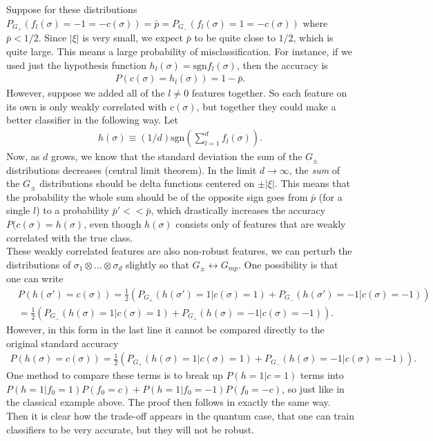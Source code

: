 \documentclass[onecolumn,prx, superscriptaddress,longbibliography,margin=1mm 11pt]{revtex4-2}
\begin{document}
     Suppose for these distributions
     $P_{G_+}(f_l(\sigma)=-1=-c(\sigma))=\bar{p}=P_{G_-}(f_l(\sigma)=1=-c(\sigma))$ where $\bar{p}<1/2$. Since $|\xi|$ is very small, we expect $\bar{p}$ to be quite close to $1/2$, which is quite large. This means a large probability of misclassification. For instance, if we used just the hypothesis function $h_l(\sigma)=\text{sgn}f_l(\sigma)$, then the accuracy is 
     \begin{align}
         P(c(\sigma)=h_l(\sigma))=1-\bar{p}.
     \end{align}
     However, suppose we added all of the $l\neq 0$ features together. So each feature on its own is only weakly correlated with $c(\sigma)$, but together they could make a better classifier in the following way. Let 
     \begin{align}
        h(\sigma) \equiv (1/d) \text{sgn}(\sum_{l=1}^d f_l(\sigma)).
     \end{align}
     Now, as $d$ grows, we know that the standard deviation the sum of the $G_{\pm}$ distributions decreases (central limit theorem). In the limit $d \rightarrow \infty$, the \textit{sum} of the $G_{\pm}$ distributions should be delta functions centered on $\pm|\xi|$. This means that the probability the whole sum should be of the opposite sign goes from $\bar{p}$ (for a single $l$) to a probability $\bar{p}'<<\bar{p}$, which drastically increases the accuracy $P(c(\sigma)=h(\sigma)$, even though $h(\sigma)$ consists only of features that are weakly correlated with the true class. \\
     
     These weakly correlated features are also non-robust features, we can perturb the distributions of $\sigma_1 \otimes...\otimes \sigma_d$ slightly so that $G_{\pm} \leftrightarrow G_{mp}$. One possibility is that one can write
     \begin{align}
        & P(h(\sigma')=c(\sigma))=\frac{1}{2}(P_{G_+}(h(\sigma')=1|c(\sigma)=1)+P_{G_-}(h(\sigma')=-1|c(\sigma)=-1)) \nonumber \\
        &=\frac{1}{2}(P_{G_-}(h(\sigma)=1|c(\sigma)=1)+P_{G_+}(h(\sigma)=-1|c(\sigma)=-1)).
     \end{align}
     However, in this form  in the last line it cannot be compared directly to the original standard accuracy
     \begin{align}
         P(h(\sigma)=c(\sigma))=\frac{1}{2}(P_{G_+}(h(\sigma)=1|c(\sigma)=1)+P_{G_-}(h(\sigma)=-1|c(\sigma)=-1)).
     \end{align}
     One method to compare these terms is to break up $P(h=1|c=1)$ terms into $P(h=1|f_0=1)P(f_0=c)+P(h=1|f_0=-1)P(f_0=-c)$, so just like in the classical example above. The proof then follows in exactly the same way. Then it is clear how the trade-off appears in the quantum case, that one can train classifiers to be very accurate, but they will not be robust. \\
\end{document}
